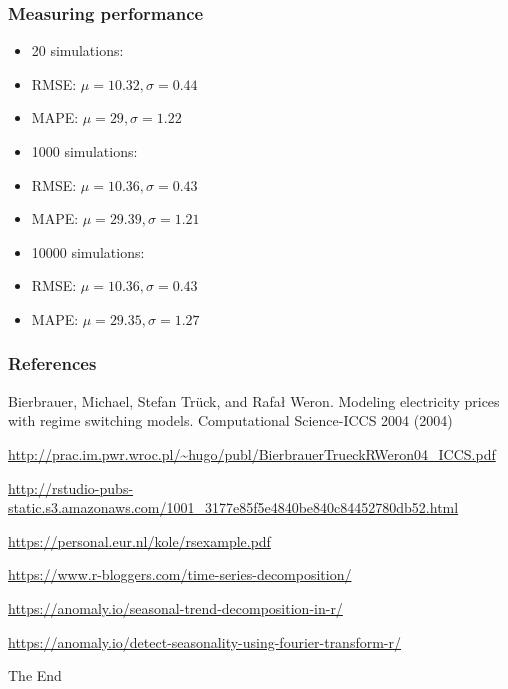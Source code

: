\documentclass{beamer}
\begin{document}
\begin{frame}
\frametitle{Measuring performance}

\begin{itemize}
\item 20 simulations:
\item RMSE: $\mu = 10.32, \sigma = 0.44$
\item MAPE: $\mu = 29, \sigma = 1.22$
\item 1000 simulations:
\item RMSE: $\mu = 10.36, \sigma = 0.43$
\item MAPE: $\mu = 29.39, \sigma = 1.21$
\item 10000 simulations:
\item RMSE: $\mu = 10.36, \sigma = 0.43$
\item MAPE: $\mu = 29.35, \sigma = 1.27$
\end{itemize}


\end{frame}


\begin{frame}
\frametitle{References}
\footnotesize{
\begin{thebibliography}{99} %
 Bierbrauer, Michael, Stefan Trück, and Rafał Weron.
\newblock Modeling electricity prices with regime switching models.
\newblock Computational Science-ICCS 2004 (2004)

 \url{http://prac.im.pwr.wroc.pl/~hugo/publ/BierbrauerTrueckRWeron04_ICCS.pdf}

 \url{http://rstudio-pubs-static.s3.amazonaws.com/1001_3177e85f5e4840be840c84452780db52.html}

 \url{https://personal.eur.nl/kole/rsexample.pdf}

 \url{https://www.r-bloggers.com/time-series-decomposition/}

 \url{https://anomaly.io/seasonal-trend-decomposition-in-r/}

 \url{https://anomaly.io/detect-seasonality-using-fourier-transform-r/}

\end{thebibliography}
}
\end{frame}

\begin{frame}
\Huge{\centerline{The End}}
\end{frame}

\end{document}
